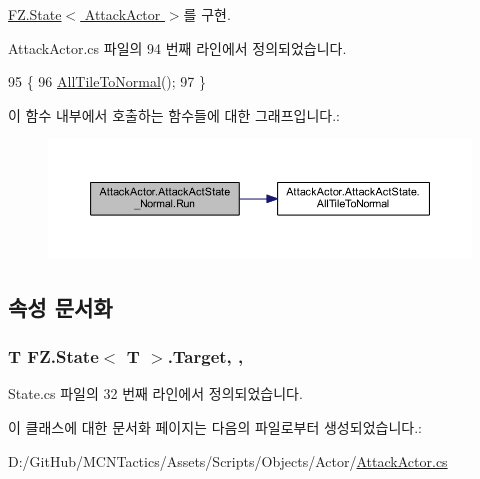 \hyperlink{class_f_z_1_1_state_acaf1584680a2e69e2a4da20574723981}{F\+Z.\+State$<$ Attack\+Actor $>$}를 구현.



Attack\+Actor.\+cs 파일의 94 번째 라인에서 정의되었습니다.


\begin{DoxyCode}
95         \{
96             \hyperlink{class_attack_actor_1_1_attack_act_state_a993762ec959af926e416f03fa7b71203}{AllTileToNormal}();
97         \}
\end{DoxyCode}


이 함수 내부에서 호출하는 함수들에 대한 그래프입니다.\+:
\nopagebreak
\begin{figure}[H]
\begin{center}
\leavevmode
\includegraphics[width=350pt]{class_attack_actor_1_1_attack_act_state___normal_a7d6644fed269325b8f62138d8adb50f5_cgraph}
\end{center}
\end{figure}




\subsection{속성 문서화}
\subsubsection[{\texorpdfstring{Target}{Target}}]{\setlength{\rightskip}{0pt plus 5cm}T {\bf F\+Z.\+State}$<$ T $>$.Target\hspace{0.3cm}{\ttfamily [get]}, {\ttfamily [protected]}, {\ttfamily [inherited]}}\hypertarget{class_f_z_1_1_state_a6927f5c9f2517052f9dc5596188e9d95}{}\label{class_f_z_1_1_state_a6927f5c9f2517052f9dc5596188e9d95}


State.\+cs 파일의 32 번째 라인에서 정의되었습니다.



이 클래스에 대한 문서화 페이지는 다음의 파일로부터 생성되었습니다.\+:\begin{DoxyCompactItemize}
\item 
D\+:/\+Git\+Hub/\+M\+C\+N\+Tactics/\+Assets/\+Scripts/\+Objects/\+Actor/\hyperlink{_attack_actor_8cs}{Attack\+Actor.\+cs}\end{DoxyCompactItemize}
